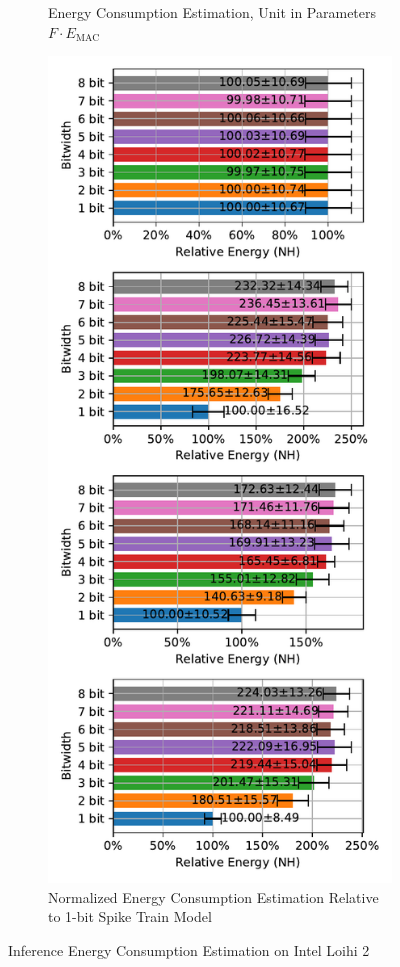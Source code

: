 \begin{figure}[H]
\begin{subfigure}[H]{0.495\textwidth}
                \caption{Energy Consumption Estimation, Unit in Parameters $F\cdot E_{\text{MAC}}$}
            \end{subfigure}
            \hfill
            \begin{subfigure}[H]{0.495\textwidth}
                \includegraphics[width=\textwidth]{../standard/FashionMNIST/plots/fashionmnist_test_relative_energy_nh.pdf}
                \caption{Normalized Energy Consumption Estimation Relative to 1-bit Spike Train Model}
            \end{subfigure}
            \caption{Inference Energy Consumption Estimation on Intel Loihi 2}
        \end{figure}
    
